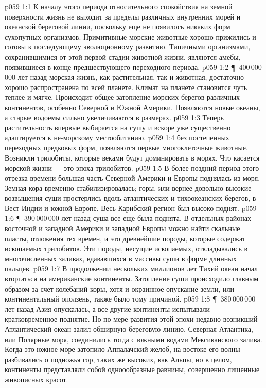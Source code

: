 \vs p059 1:1 К началу этого периода относительного спокойствия на земной поверхности жизнь не выходит за пределы различных внутренних морей и океанской береговой линии, поскольку еще не появилось никаких форм сухопутных организмов. Примитивные морские животные хорошо прижились и готовы к последующему эволюционному развитию. Типичными организмами, сохранившимися от этой первой стадии животной жизни, являются амебы, появившиеся в конце предшествующего переходного периода.
\vs p059 1:2 \P\ 400\,000\,000 лет назад морская жизнь, как растительная, так и животная, достаточно хорошо распространена по всей планете. Климат на планете становится чуть теплее и мягче. Происходит общее затопление морских берегов различных континентов, особенно Северной и Южной Америки. Появляются новые океаны, а старые водоемы сильно увеличиваются в размерах.
\vs p059 1:3 Теперь растительность впервые выбирается на сушу и вскоре уже существенно адаптируется к не\hyp{}морскому местообитанию.
\vs p059 1:4  без постепенных переходных предковых форм, появляются первые многоклеточные животные. Возникли трилобиты, которые веками будут доминировать в морях. Что касается морской жизни --- это эпоха трилобитов.
\vs p059 1:5 В более поздний период этого отрезка времени большая часть Северной Америки и Европы поднялась из моря. Земная кора временно стабилизировалась; горы, или вернее довольно высокие возвышения суши простерлись вдоль атлантических и тихоокеанских берегов, в Вест\hyp{}Индии и южной Европе. Весь Карибский регион был высоко поднят.
\vs p059 1:6 \P\ 390\,000\,000 лет назад суша все еще была поднята. В отдельных районах восточной и западной Америки и западной Европы можно найти скальные пласты, отложения тех времен, и это древнейшие породы, которые содержат ископаемых трилобитов. Эти породы, несущие ископаемых, откладывались в многочисленных заливах, вдававшихся в массивы суши в форме длинных пальцев.
\vs p059 1:7 В продолжении нескольких миллионов лет Тихий океан начал вторгаться на американские континенты. Затопление суши происходило главным образом за счет колебаний коры, хотя и окраинное опускание земли, или континентальный оползень, также было тому причиной.
\vs p059 1:8 \P\ 380\,000\,000 лет назад Азия опускалась, а все другие континенты испытывали кратковременное поднятие. Но по мере развития этой эпохи недавно возникший Атлантический океан залил обширную береговую линию. Северная Атлантика, или Полярные моря, соединились тогда с южными водами Мексиканского залива. Когда это южное море затопило Аппалачский желоб, на востоке его волны разбивались о подножья гор, таких же высоких, как Альпы, но в целом, континенты представляли собой одноообразные равнины, совершенно лишенные живописных красот.
